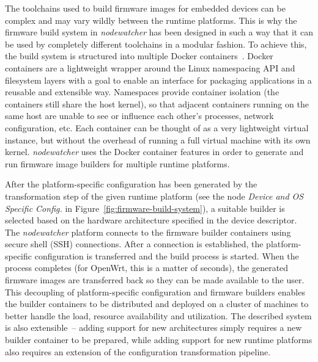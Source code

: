 \documentclass[5p,sort&compress]{elsarticle}
\newcommand{\nodewatcher}{\textit{nodewatcher}}
\begin{document}
The toolchains used to build firmware images for embedded devices can be complex and may vary wildly between the runtime platforms.
This is why the firmware build system in \nodewatcher{} has been designed in such a way that it can be used by completely different toolchains in a modular fashion.
To achieve this, the build system is structured into multiple Docker containers~\cite{Docker_2013}.
Docker containers are a lightweight wrapper around the Linux namespacing API and filesystem layers with a goal to enable an interface for packaging applications in a reusable and extensible way.
Namespaces provide container isolation (the containers still share the host kernel), so that adjacent containers running on the same host are unable to see or influence each other's processes, network configuration, etc.
Each container can be thought of as a very lightweight virtual instance, but without the overhead of running a full virtual machine with its own kernel.
\nodewatcher{} uses the Docker container features in order to generate and run firmware image builders for multiple runtime platforms.

After the platform-specific configuration has been generated by the transformation step of the given runtime platform (see the node \textit{Device and OS Specific Config.} in Figure~\ref{fig:firmware-build-system}), a suitable builder is selected based on the hardware architecture specified in the device descriptor.
The \nodewatcher{} platform connects to the firmware builder containers using secure shell (SSH) connections.
After a connection is established, the platform-specific configuration is transferred and the build process is started.
When the process completes (for OpenWrt, this is a matter of seconds), the generated firmware images are transferred back so they can be made available to the user.
This decoupling of platform-specific configuration and firmware builders enables the builder containers to be distributed and deployed on a cluster of machines to better handle the load, resource availability and utilization.
The described system is also extensible~-- adding support for new architectures simply requires a new builder container to be prepared, while adding support for new runtime platforms also requires an extension of the configuration transformation pipeline.
\end{document}
